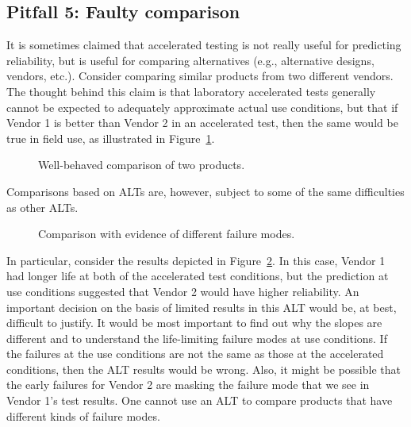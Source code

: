 \subsection{Pitfall 5: Faulty comparison}

It is sometimes claimed that accelerated testing is not really
useful for predicting reliability, but is useful for comparing
alternatives (e.g., alternative designs, vendors, etc.). Consider
comparing similar products from two different vendors.  The thought
behind this claim is that laboratory accelerated tests generally
cannot be expected to adequately approximate actual use conditions,
but that if Vendor 1 is better than Vendor 2 in an accelerated test,
then the same would be true in field use, as illustrated in
Figure~\ref{figure:standard.comparison.ps}.
\begin{figure}
\caption{Well-behaved comparison of two products.}
\label{figure:standard.comparison.ps}
\end{figure}
Comparisons based on ALTs are, however, subject to some of the same
difficulties as other ALTs. 
\begin{figure}
\caption{Comparison with evidence of different failure modes.}
\label{figure:faulty.comparison.ps}
\end{figure}
In particular, consider the results depicted in
Figure~\ref{figure:faulty.comparison.ps}.  In this case, Vendor 1
had longer life at both of the accelerated test conditions, but the
prediction at use conditions suggested that Vendor 2 would have
higher reliability.  An important decision on the basis of limited
results in this ALT would be, at best, difficult to justify.  It
would be most important to find out why the slopes are different and
to understand the life-limiting failure modes at use conditions. If
the failures at the use conditions are not the same as those at the
accelerated conditions, then the ALT results would be wrong. Also,
it might be possible that the early failures for Vendor 2 are
masking the failure mode that we see in Vendor 1's test results.
One cannot use an ALT to compare products that have different kinds
of failure modes.
